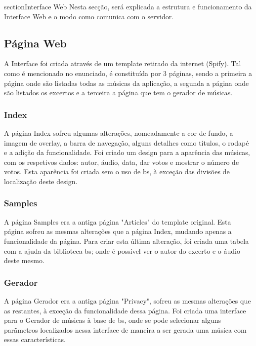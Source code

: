 \documentclass{report}
\begin{document}
section{Interface Web}
\label{sec:interfaceWeb}
\hspace{5pt}Nesta secção, será explicada a estrutura e funcionamento da Interface Web 
e o modo como comunica com o servidor.

\subsection{Página Web}
\hspace{5pt}A Interface  foi criada através de um template retirado da internet (Spify). 
Tal como é mencionado no enunciado, é constituída por 3 páginas, sendo a primeira a página 
onde são listadas todas as músicas da aplicação, a segunda a página onde são listados os 
excertos e a terceira a página que tem o gerador de músicas. 

\subsubsection{Index}
\hspace{5pt}A página Index sofreu algumas alterações, nomeadamente a cor de fundo, a imagem 
de overlay, a barra de navegação, alguns detalhes como títulos, o rodapé e a adição da 
funcionalidade. Foi criado um design para a aparência das músicas, com os respetivos dados: 
autor, áudio, data, dar votos e mostrar o número de votos. Esta aparência foi criada sem o 
uso de \ac{bs}, à exceção das divisões de localização deste design. 

\subsubsection{Samples}
\hspace{5pt}A página Samples era a antiga página "Articles" do template original. Esta página 
sofreu as mesmas alterações que a página Index, mudando apenas a funcionalidade da página. 
Para criar esta última alteração, foi criada uma tabela com a ajuda da biblioteca \ac{bs}; 
onde é possível ver o autor do excerto e o áudio deste mesmo.

\subsubsection{Gerador}
\hspace{5pt}A página Gerador era a antiga página "Privacy", sofreu as mesmas alterações que 
as restantes, à exceção da funcionalidade dessa página. Foi criada uma interface para o Gerador 
de músicas à base de \ac{bs}, onde se pode selecionar alguns parãmetros localizados nessa 
interface de maneira a ser gerada uma música com essas características. 
\end{document}
